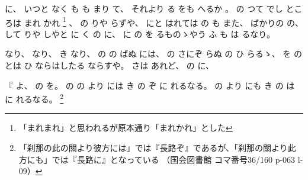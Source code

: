 に、
%
いつと
なく
も%
も%
まり
て、
%
それより
る
をも
へるか
。
%
%
の
つて
でし
ところは
まれ
かれ
\footnote{「まれまれ」と思われるが原本通り「まれかれ」とした}
、
%
の
りや
らずや、
%
にと
はれては
の
も
また、
%
ばかりの
の、
%
して
りや
しやと
に
く
の
に、
%
に
の
を
るものゝやう%
ふ
も%
は
るなり。

%
なり、
%
なり、
%
き
なり、
%
の
の
ばぬ
には、
%
の
さにぞ
らぬ
の
ひ
らるゝ、%
%
を
の
とは
ひ
ならはしたる
ならすや。
%
さは
あれど、
%
の
に、

%
『
よ、
%
の
を。
%
の
の
より
には
き
の
ぞ%
に
れるなる。
%
の
より
にも%
き
の
は
%
に
れるなる。
\footnote{「刹那の此の關より彼方には」では『長路ぞ』であるが、「刹那の關より此方にも」では『長路に』となっている
（国会図書館 コマ番号36/160 p-063 l-09）}%

